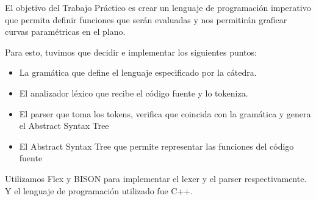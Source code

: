El objetivo del Trabajo Práctico es crear un lenguaje de programación imperativo que permita definir funciones que serán evaluadas y nos permitirán graficar curvas paramétricas en el plano. 

Para esto, tuvimos que decidir e implementar los siguientes puntos:
\begin{itemize}
\item La gramática que define el lenguaje especificado por la cátedra.
\item El analizador léxico que recibe el código fuente y lo tokeniza.
\item El parser que toma los tokens, verifica que coincida con la gramática y genera el Abstract Syntax Tree
\item El Abstract Syntax Tree que permite representar las funciones del código fuente
\end{itemize}
Utilizamos Flex y BISON para implementar el lexer y el parser respectivamente. Y el lenguaje de programación utilizado fue C++.
